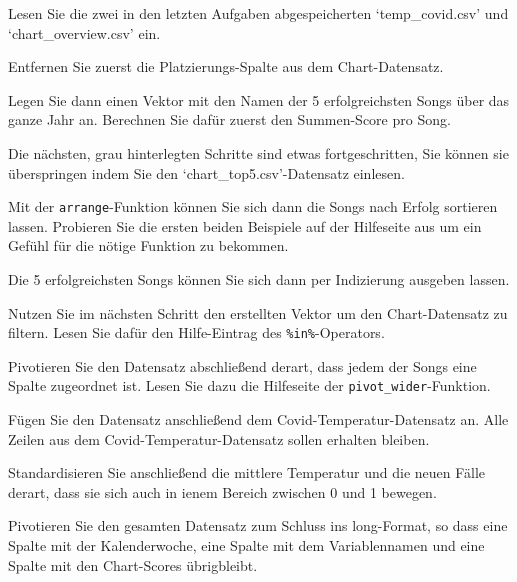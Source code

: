 \documentclass[
]{book}
\begin{document}
Lesen Sie die zwei in den letzten Aufgaben abgespeicherten `temp\_covid.csv' und `chart\_overview.csv' ein.

Entfernen Sie zuerst die Platzierungs-Spalte aus dem Chart-Datensatz.

Legen Sie dann einen Vektor mit den Namen der 5 erfolgreichsten Songs über das ganze Jahr an. Berechnen Sie dafür zuerst den Summen-Score pro Song.

Die nächsten, grau hinterlegten Schritte sind etwas fortgeschritten, Sie können sie überspringen indem Sie den `chart\_top5.csv'-Datensatz einlesen.

Mit der \texttt{arrange}-Funktion können Sie sich dann die Songs nach Erfolg sortieren lassen. Probieren Sie die ersten beiden Beispiele auf der Hilfeseite aus um ein Gefühl für die nötige Funktion zu bekommen.

Die 5 erfolgreichsten Songs können Sie sich dann per Indizierung ausgeben lassen.

Nutzen Sie im nächsten Schritt den erstellten Vektor um den Chart-Datensatz zu filtern. Lesen Sie dafür den Hilfe-Eintrag des \texttt{\%in\%}-Operators.

Pivotieren Sie den Datensatz abschließend derart, dass jedem der Songs eine Spalte zugeordnet ist. Lesen Sie dazu die Hilfeseite der \texttt{pivot\_wider}-Funktion.

Fügen Sie den Datensatz anschließend dem Covid-Temperatur-Datensatz an. Alle Zeilen aus dem Covid-Temperatur-Datensatz sollen erhalten bleiben.

Standardisieren Sie anschließend die mittlere Temperatur und die neuen Fälle derart, dass sie sich auch in ienem Bereich zwischen 0 und 1 bewegen.

Pivotieren Sie den gesamten Datensatz zum Schluss ins long-Format, so dass eine Spalte mit der Kalenderwoche, eine Spalte mit dem Variablennamen und eine Spalte mit den Chart-Scores übrigbleibt.
\end{document}
